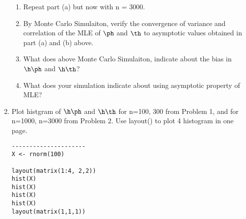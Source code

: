 \begin{enumerate}
\begin{enumerate}
\item Repeat part (a) but now with n = 3000. 


\item By Monte Carlo Simulaiton, verify the convergence of variance and correlation of the 
MLE of $\ph$ and $\th$ to asymptotic values obtained in part (a) and (b) above. 


\item What does above Monte Carlo Simulaiton, indicate about the bias in 
$\h \ph$ and $\h \th$? 

\item What does your simulation indicate about using asymptotic property of 
MLE?

\end{enumerate}


\item Plot histgram of $\h \ph$ and $\h \th$ for 
n=100, 300 from Problem 1, and for n=1000, n=3000 from Problem 2.  
Use layout() to plot 4 histogram in one page. 


\begin{verbatim} 
---------------------
X <- rnorm(100)

layout(matrix(1:4, 2,2))
hist(X)
hist(X)
hist(X)
hist(X)
layout(matrix(1,1,1))
\end{verbatim}



\end{enumerate}



